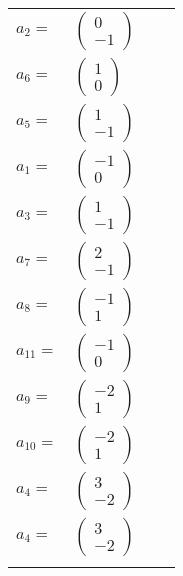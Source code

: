 \documentclass[1p]{elsarticle_modified}
\theoremstyle{definition}
\begin{document}
\begin{tabular}{m{7pt} m{180pt} m{7pt} m{180pt} }
\flushright $a_{2}=$&$\begin{pmatrix}0\\-1\end{pmatrix}$ \\
\flushright $a_{6}=$&$\begin{pmatrix}1\\0\end{pmatrix}$ \\
\flushright $a_{5}=$&$\begin{pmatrix}1\\-1\end{pmatrix}$ \\
\flushright $a_{1}=$&$\begin{pmatrix}-1\\0\end{pmatrix}$ \\
\flushright $a_{3}=$&$\begin{pmatrix}1\\-1\end{pmatrix}$ \\
\flushright $a_{7}=$&$\begin{pmatrix}2\\-1\end{pmatrix}$ \\
\flushright $a_{8}=$&$\begin{pmatrix}-1\\1\end{pmatrix}$ \\
\flushright $a_{11}=$&$\begin{pmatrix}-1\\0\end{pmatrix}$ \\
\flushright $a_{9}=$&$\begin{pmatrix}-2\\1\end{pmatrix}$ \\
\flushright $a_{10}=$&$\begin{pmatrix}-2\\1\end{pmatrix}$ \\
\flushright $a_{4}=$&$\begin{pmatrix}3\\-2\end{pmatrix}$\\ \flushright $a_{4}=$&$\begin{pmatrix}3\\-2\end{pmatrix}$\\&\end{tabular}
\end{document}
